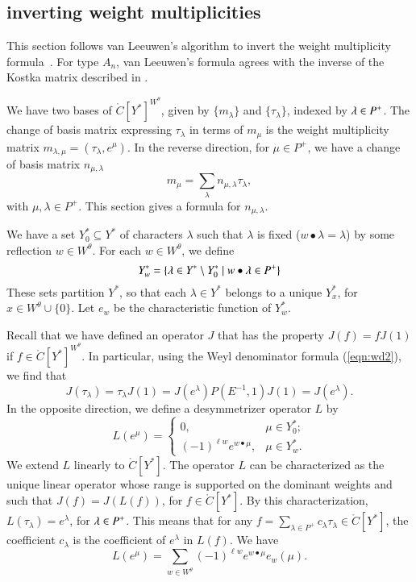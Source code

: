 \subsection{inverting weight multiplicities}

This section follows  van Leeuwen's algorithm to invert the weight multiplicity
formula~\cite{vanleeuwen}.  
For type $A_n$, van Leeuwen's formula agrees with the inverse of the Kostka
matrix described in \cite{duan}.

We have two bases of $\ring{C}[Y^*]^{W^\theta}$, given by $\{m_\lambda\}$ and $\{\tau_\lambda\}$, indexed
by $\lambda\in P^+$.  
The change of basis matrix expressing $\tau_\lambda$ in terms of $m_\mu$ is the weight multiplicity
matrix $m_{\lambda,\mu} = (\tau_\lambda,e^\mu)$.  
In the reverse direction, for $\mu\in P^+$,
we have a change of basis matrix $n_{\mu,\lambda}$ 
\begin{equation}\label{eqn:n}
m_\mu = \sum_{\lambda} n_{\mu,\lambda} \tau_\lambda,
\end{equation}
with $\mu,\lambda\in P^+$.
This section gives a formula for $n_{\mu,\lambda}$.  

We have a set $Y^*_0\subseteq Y^*$ of characters $\lambda$ such that $\lambda$ is fixed 
($w\bullet \lambda = \lambda$) by some
reflection  $w\in W^\theta$.  For each $w\in W^\theta$, we define
\[
Y^*_w = \{\lambda\in Y^*\setminus Y^*_0\mid w\bullet \lambda \in P^+\}
\]
These sets partition $Y^*$, so that each $\lambda\in Y^*$ belongs to a unique $Y^*_x$, for $x\in W^\theta\cup\{0\}$.
Let $e_w$ be the characteristic function of $Y^*_w$.

Recall that we have defined an operator
$J$ that has the property $J(f) = f J(1)$ if $f\in \ring{C}[Y^*]^{W^\theta}$.
In particular, using the Weyl denominator formula (\ref{eqn:wd2}), we find that
\[
 J(\tau_\lambda) = \tau_\lambda J(1) = J(e^\lambda) P(E^{-1},1) J(1) = J(e^\lambda).
\]
In the opposite direction, we define a desymmetrizer operator $L$ by
\[
L(e^\mu) = \begin{cases}
0,& \mu\in Y^*_0;\\
(-1)^{\ell{w}} e^{w\bullet \mu},& \mu\in Y^*_w.
\end{cases}
\]
We extend $L$ linearly to $\ring{C}[Y^*]$.
The operator $L$ can be characterized as the unique linear operator whose range is supported on
the dominant weights and such that $J(f) = J(L(f))$, for $f\in \ring{C}[Y^*]$.
By this characterization, $L(\tau_\lambda) = e^\lambda$, for $\lambda\in P^+$.  This means that
for any $f = \sum_{\lambda\in P^+} c_\lambda \tau_\lambda \in \ring{C}[Y^*]$, the coefficient $c_\lambda$
is the coefficient of $e^\lambda$ in $L(f)$.  We have 
\[
L(e^\mu) = \sum_{w\in W^\theta} (-1)^{\ell w} e^{w\bullet \mu} e_w(\mu).
\]

